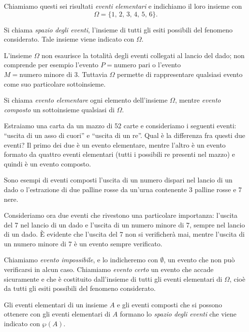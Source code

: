 Chiamiamo questi sei risultati \emph{eventi elementari} e indichiamo il loro insieme con 
\[\Omega =\{1\text{, }2\text{, }3\text{, }4\text{, }5\text{, }6\}.\]

\begin{definizione}
Si chiama \emph{spazio degli eventi}, l'insieme di tutti gli esiti possibili del fenomeno considerato. Tale insieme viene indicato con $\Omega$.
\end{definizione}

L'insieme $\Omega$ non esaurisce la totalità degli eventi collegati al lancio del dado; non comprende per esempio l'evento $P=\text{numero pari}$ o l'evento $M=\text{numero minore di }3$. Tuttavia $\Omega$ permette di rappresentare qualsiasi evento come suo particolare sottoinsieme.

\begin{definizione}
Si chiama \emph{evento elementare} ogni elemento dell'insieme $\Omega$, mentre \emph{evento composto} un sottoinsieme qualsiasi di $\Omega$.
\end{definizione}

Estraiamo una carta da un mazzo di 52 carte e consideriamo i seguenti eventi: ``uscita di un asso di cuori'' e ``uscita di un re''. Qual è la differenza fra questi due eventi? Il primo dei due è un evento elementare, mentre l'altro è un evento formato da quattro eventi elementari (tutti i possibili re presenti nel mazzo) e quindi è un evento composto.

Sono esempi di eventi composti l'uscita di un numero dispari nel lancio di un dado o l'estrazione di due palline rosse da un'urna contenente 3 palline rosse e 7 nere.

Consideriamo ora due eventi che rivestono una particolare importanza: l'uscita del 7 nel lancio di un dado e l'uscita di un numero minore di 7, sempre nel lancio di un dado. È evidente che l'uscita del 7 non si verificherà mai, mentre l'uscita di un numero minore di 7 è un evento sempre verificato.

\begin{definizione}
Chiamiamo \emph{evento impossibile}, e lo indicheremo con $\emptyset$, un evento che non può verificarsi in alcun caso.
Chiamiamo \emph{evento certo} un evento che accade sicuramente e che è costituito dall'insieme di tutti gli eventi elementari di $\Omega$, cioè da tutti gli esiti possibili del fenomeno considerato.
\end{definizione}

Gli eventi elementari di un insieme $A$ e gli eventi composti che si possono ottenere con gli eventi elementari di $A$ formano lo \emph{spazio degli eventi} che viene indicato con $\wp(A)$.

